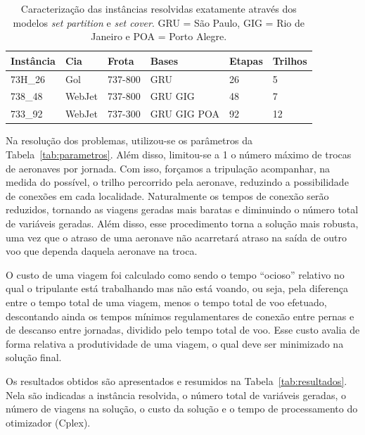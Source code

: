 \documentclass[12pt,a4paper]{article}
\begin{document}
\begin{table}[htb]
	\begin{center} 
		\begin{tabular}{|l|l|l|l|l|l|}
			\hline 
			{\bf Instância} & {\bf Cia} & {\bf Frota} & {\bf Bases} & {\bf Etapas} & {\bf Trilhos} \\ 
			\hline \hline
			73H\_26 & Gol & 737-800 & GRU & 26 & 5 \\ 
			738\_48 & WebJet & 737-800 & GRU GIG & 48 & 7 \\ 
			733\_92 & WebJet & 737-300 & GRU GIG POA & 92 & 12 \\ \hline
		\end{tabular}
		\caption{Caracterização das instâncias resolvidas exatamente através dos modelos 
		{\it set partition} e {\it set cover}. GRU = São Paulo, GIG = Rio de Janeiro e 
		POA = Porto Alegre.}
		\label{tab:instancias}
	\end{center}
\end{table}

Na resolução dos problemas, utilizou-se os parâmetros da Tabela~\ref{tab:parametros}. Além disso,
limitou-se a 1 o número máximo de trocas de aeronaves por jornada. Com isso, forçamos a tripulação
acompanhar, na medida do possível, o trilho percorrido pela aeronave, reduzindo a possibilidade de
conexões em cada localidade. Naturalmente os tempos de conexão serão reduzidos, tornando as 
viagens geradas mais baratas e diminuindo o número total de variáveis geradas. Além disso, esse 
procedimento torna a solução mais robusta, uma vez que o atraso de uma aeronave não acarretará 
atraso na saída de outro voo que dependa daquela aeronave na troca.

O custo de uma viagem foi calculado como sendo o tempo ``ocioso'' relativo no qual o tripulante está 
trabalhando mas não está voando, ou seja, pela diferença entre o tempo total de uma viagem, menos o 
tempo total de voo efetuado, descontando ainda os tempos mínimos regulamentares de conexão entre 
pernas e de descanso entre jornadas, dividido pelo tempo total de voo. Esse custo avalia de forma 
relativa a produtividade de uma viagem, o qual deve ser minimizado na solução final.

Os resultados obtidos são apresentados e resumidos na Tabela~\ref{tab:resultados}. Nela são 
indicadas a instância resolvida, o número total de variáveis geradas, o número de viagens na 
solução, o custo da solução e o tempo de processamento do otimizador (Cplex).
\end{document}
